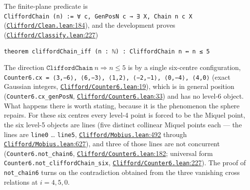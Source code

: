 \documentclass[11pt]{article}
\theoremstyle{definition}
\theoremstyle{remark}
\begin{document}
The finite-plane predicate is \texttt{CliffordChain\ (n)\ \allowbreak :=\ ∀\ c,\ GenPosN\ c\ →\ ∃\ X,\ Chain\ n\ c\ X}
(\href{https://github.com/jpbald93/paperl_clifford_chain/blob/e1ae145c2565cc98816635387412edc0a740c27c/Clifford/Clean.lean\#L184}{\texttt{Clifford/\allowbreak Clean.lean}:184}), and the development proves (\href{https://github.com/jpbald93/paperl_clifford_chain/blob/e1ae145c2565cc98816635387412edc0a740c27c/Clifford/Classify.lean\#L227}{\texttt{Clifford/\allowbreak Classify.lean}:227})

\begin{Verbatim}
theorem cliffordChain_iff (n : ℕ) : CliffordChain n ↔ n ≤ 5
\end{Verbatim}

The direction \(\texttt{CliffordChain}\ n \Rightarrow n \le 5\) is by a single six-centre configuration,
\texttt{Counter6.\allowbreak cx\ =\ ⟨3,−6⟩,\ ⟨6,−3⟩,\ ⟨1,2⟩,\ ⟨−2,−1⟩,\ ⟨0,−4⟩,\ ⟨4,0⟩} (exact Gaussian integers,
\href{https://github.com/jpbald93/paperl_clifford_chain/blob/e1ae145c2565cc98816635387412edc0a740c27c/Clifford/Counter6.lean\#L19}{\texttt{Clifford/\allowbreak Counter6.lean}:19}), which is in general position (\texttt{Counter6.\allowbreak cx\_\allowbreak genPosN},
\href{https://github.com/jpbald93/paperl_clifford_chain/blob/e1ae145c2565cc98816635387412edc0a740c27c/Clifford/Counter6.lean\#L33}{\texttt{Clifford/\allowbreak Counter6.lean}:33}) and has no level-6 object. What happens there is worth stating, because it is
the phenomenon the sphere repairs. For these six centres every level-4 point is forced to be the Miquel
point, the six level-5 objects are lines (five distinct collinear Miquel points each --- the lines are
\texttt{line0} \ldots{} \texttt{line5}, \href{https://github.com/jpbald93/paperl_clifford_chain/blob/e1ae145c2565cc98816635387412edc0a740c27c/Clifford/Mobius.lean\#L492}{\texttt{Clifford/\allowbreak Mobius.lean}:492} through \href{https://github.com/jpbald93/paperl_clifford_chain/blob/e1ae145c2565cc98816635387412edc0a740c27c/Clifford/Mobius.lean\#L627}{\texttt{Clifford/\allowbreak Mobius.lean}:627}), and three of those
lines are not concurrent (\texttt{Counter6.\allowbreak not\_\allowbreak chain6}, \href{https://github.com/jpbald93/paperl_clifford_chain/blob/e1ae145c2565cc98816635387412edc0a740c27c/Clifford/Counter6.lean\#L182}{\texttt{Clifford/\allowbreak Counter6.lean}:182}; universal form
\texttt{Counter6.\allowbreak not\_\allowbreak cliffordChain\_\allowbreak six}, \href{https://github.com/jpbald93/paperl_clifford_chain/blob/e1ae145c2565cc98816635387412edc0a740c27c/Clifford/Counter6.lean\#L227}{\texttt{Clifford/\allowbreak Counter6.lean}:227}). The proof of \texttt{not\_\allowbreak chain6} turns on the
contradiction obtained from the three vanishing cross relations at \(i = 4, 5, 0\).
\end{document}
